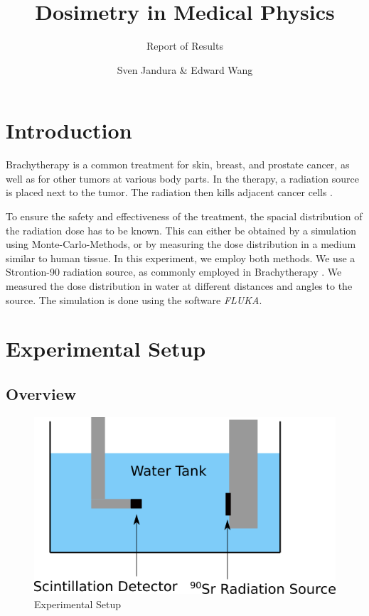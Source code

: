\documentclass[a4paper,parskip]{scrartcl}
\author{Sven Jandura \& Edward Wang}
\title{Dosimetry in Medical Physics}
\subtitle{Report of Results}
\begin{document}
\maketitle

\tableofcontents

\section{Introduction}

Brachytherapy is a common treatment for skin, breast, and prostate cancer, as well as for other tumors at various body parts. In the therapy, a radiation source is placed next to the tumor. The radiation then kills adjacent cancer cells \cite{Ref:1}.

To ensure the safety and effectiveness of the treatment, the spacial distribution of the radiation dose has to be known. This can either be obtained by a simulation using Monte-Carlo-Methods, or by measuring the dose distribution in a medium similar to human tissue. In this experiment, we employ both methods. We use a Strontion-90 radiation source, as commonly employed in Brachytherapy \cite{Ref:2}. We measured the dose distribution in water at different distances and angles to the source.  The simulation is done using the software \textit{FLUKA}. 

\section{Experimental Setup}

\subsection{Overview}

\begin{figure}
\centering
\includegraphics[width = 0.7\linewidth]{overviewCut.png}
\caption{Experimental Setup}
\label{Setup}
\end{figure}
\end{document}
